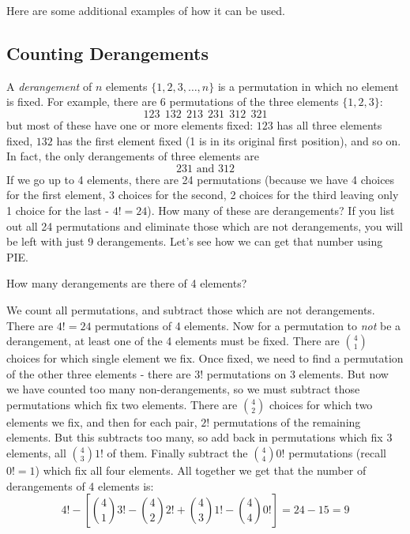 \documentclass[12pt]{article}
\begin{document}
Here are some additional examples of how it can be used.

\subsection{Counting Derangements}

A {\em derangement} of $n$ elements $\{1,2,3,\ldots, n\}$ is a permutation in which no element is fixed.  For example, there are $6$ permutations of the three elements $\{1,2,3\}$:
\[123 ~~ 132 ~~ 213 ~~ 231 ~~ 312 ~~ 321\]
but most of these have one or more elements fixed: $123$ has all three elements fixed, $132$ has the first element fixed (1 is in its original first position), and so on.  In fact, the only derangements of three elements are
\[231 \mbox{  and  }312\]
If we go up to 4 elements, there are 24 permutations (because we have 4 choices for the first element, 3 choices for the second, 2 choices for the third leaving only 1 choice for the last - $4! = 24$).  How many of these are derangements?  If you list out all 24 permutations and eliminate those which are not derangements, you will be left with just 9 derangements.  Let's see how we can get that number using PIE.

\begin{example}
  How many derangements are there of 4 elements?
  \begin{solution}
    We count all permutations, and subtract those which are not derangements.  There are $4! = 24$ permutations of 4 elements.  Now for a permutation to {\em not} be a derangement, at least one of the 4 elements must be fixed.  There are ${4 \choose 1}$ choices for which single element we fix.  Once fixed, we need to find a permutation of the other three elements - there are $3!$ permutations on 3 elements.  But now we have counted too many non-derangements, so we must subtract those permutations which fix two elements.  There are ${4 \choose 2}$ choices for which two elements we fix, and then for each pair, $2!$ permutations of the remaining elements.  But this subtracts too many, so add back in permutations which fix 3 elements, all ${4 \choose 3}1!$ of them.  Finally subtract the ${4 \choose 4}0!$ permutations (recall $0! = 1$) which fix all four elements.  All together we get that the number of derangements of 4 elements is:
    \[4! - \left[{4 \choose 1}3! - {4 \choose 2}2! + {4 \choose 3} 1! - {4 \choose 4}0!\right] = 24 - 15 = 9\]
    
  \end{solution}

\end{example}
\end{document}
